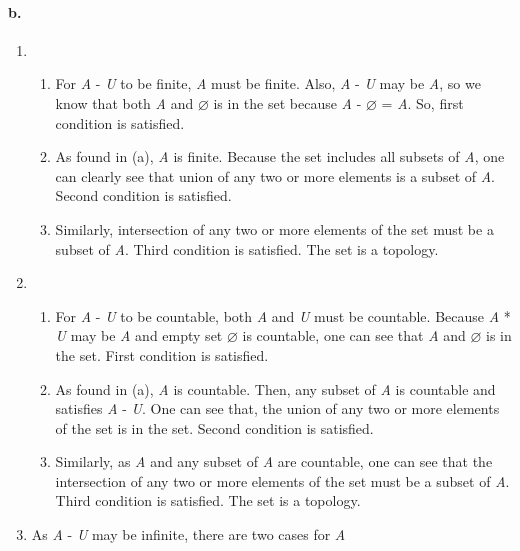 \documentclass[11pt]{article}
\begin{document}
\paragraph{b.}
\renewcommand{\theenumi}{\textbf{\roman{enumi}}}%
\begin{enumerate}
    \item 
    \begin{enumerate}
        \item For \emph{A} - \emph{U} to be finite, \emph{A} must be finite. Also, \emph{A} - \emph{U} may be \emph{A}, so we know that both \emph{A} and $\varnothing$ is in the set because \emph{A} - $\varnothing$ = \emph{A}. So, first condition is satisfied.
        \item As found in (a), \emph{A} is finite. Because the set includes all subsets of \emph{A}, one can clearly see that union of any two or more elements is a subset of \emph{A}. Second condition is satisfied.
        \item Similarly, intersection of any two or more elements of the set must be a subset of \emph{A}. Third condition is satisfied. \newline \newline
        The set is a topology.
    \end{enumerate}
    \item
    \begin{enumerate}
        \item For \emph{A} - \emph{U} to be countable, both \emph{A} and \emph{U} must be countable. Because \emph{A} * \emph{U} may be \emph{A} and empty set $\varnothing$ is countable, one can see that \emph{A} and $\varnothing$ is in the set. First condition is satisfied.
        \item As found in (a), \emph{A} is countable. Then, any subset of \emph{A} is countable and satisfies \emph{A} - \emph{U}. One can see that, the union of any two or more elements of the set is in the set. Second condition is satisfied.
        \item Similarly, as \emph{A} and any subset of \emph{A} are countable, one can see that the intersection of any two or more elements of the set must be a subset of \emph{A}. Third condition is satisfied. \newline \newline
        The set is a topology.
    \end{enumerate}
    \item As \emph{A} - \emph{U} may be infinite, there are two cases for \emph{A}
    \begin{enumerate}

\end{enumerate}
\end{enumerate}
\end{document}

